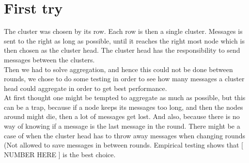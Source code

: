 \documentclass{article}
\begin{document}
  \section{First try}
   The cluster was chosen by its row. Each row is then a single cluster. Messages
   is sent to the right as long as possible, until it reaches the right most
   node which is then chosen as the cluster head. The cluster head has the
   responsibility to send messages between the clusters.\\
   Then we had to solve aggregation, and hence this could not be done between
   rounds, we chose to do some testing in order to see how many messages a cluster
   head could aggregate in order to get best performance.\\
   At first thought one might be tempted to aggregate as much as possible, but
   this can be a trap, because if a node keeps its messages too long, and then
   the nodes around might die, then a lot of messages get lost. And also, because
   there is no way of knowing if a message is the last message in the round. There might be
   a case of when the cluster head has to throw away messages when changing
   rounds (Not allowed to save messages in between rounds. Empirical testing
   shows that [ NUMBER HERE ] is the best choice.
     
\end{document}
